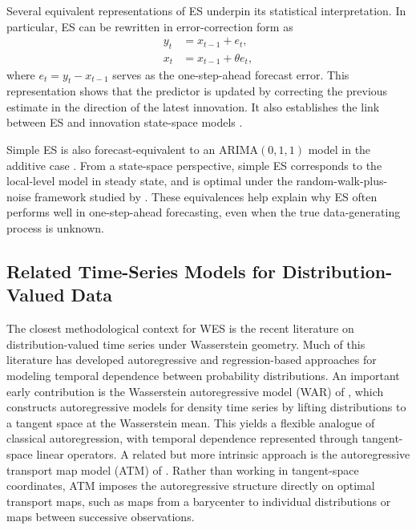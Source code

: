 \documentclass[a4paper, 11pt]{article}
\theoremstyle{definition}
\begin{document}
Several equivalent representations of ES underpin its statistical interpretation.
In particular, ES can be rewritten in error-correction form as
\begin{align}
    y_t &= x_{t-1} + e_t, \label{eq:es error correction form 1}\\
    x_t &= x_{t-1} + \theta e_t, \label{eq:es error correction form 2}
\end{align}
where $e_t = y_t - x_{t-1}$ serves as the one-step-ahead forecast error. 
This representation shows that the predictor is updated by correcting the previous estimate in the direction of the latest innovation. 
It also establishes the link between ES and innovation state-space models \citep{Hyndman2008}.

Simple ES is also forecast-equivalent to an ARIMA$(0,1,1)$ model in the additive case \citep{Gardner2006,Hyndman2008}. 
From a state-space perspective, simple ES corresponds to the local-level model in steady state, and is optimal under the random-walk-plus-noise framework studied by \citet{Muth1960}. 
These equivalences help explain why ES often performs well in one-step-ahead forecasting, even when the true data-generating process is unknown.


\subsection{Related Time-Series Models for Distribution-Valued Data}
\label{sec:related_work}

The closest methodological context for WES is the recent literature on distribution-valued time series under Wasserstein geometry. 
Much of this literature has developed autoregressive and regression-based approaches for modeling temporal dependence between probability distributions. 
An important early contribution is the Wasserstein autoregressive model (WAR) of \citet{zhang2022wasserstein}, which constructs autoregressive models for density time series by lifting distributions to a tangent space at the Wasserstein mean. 
This yields a flexible analogue of classical autoregression, with temporal dependence represented through tangent-space linear operators.
A related but more intrinsic approach is the autoregressive transport map model (ATM) of \citet{Zhu2023}. 
Rather than working in tangent-space coordinates, ATM imposes the autoregressive structure directly on optimal transport maps, such as maps from a barycenter to individual distributions or maps between successive observations.
\end{document}
